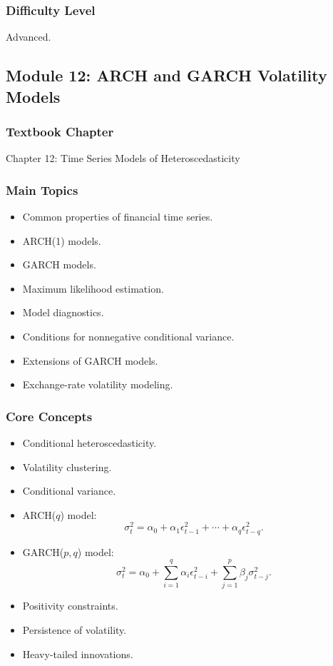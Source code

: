 \documentclass[11pt]{article}
\begin{document}
\subsubsection*{Difficulty Level}
Advanced.

\subsection{Module 12: ARCH and GARCH Volatility Models}

\subsubsection*{Textbook Chapter}
Chapter 12: Time Series Models of Heteroscedasticity

\subsubsection*{Main Topics}
\begin{itemize}
    \item Common properties of financial time series.
    \item ARCH(1) models.
    \item GARCH models.
    \item Maximum likelihood estimation.
    \item Model diagnostics.
    \item Conditions for nonnegative conditional variance.
    \item Extensions of GARCH models.
    \item Exchange-rate volatility modeling.
\end{itemize}

\subsubsection*{Core Concepts}
\begin{itemize}
    \item Conditional heteroscedasticity.
    \item Volatility clustering.
    \item Conditional variance.
    \item ARCH($q$) model:
    \[
        \sigma_t^2 = \alpha_0 +
        \alpha_1\epsilon_{t-1}^2 + \cdots +
        \alpha_q\epsilon_{t-q}^2.
    \]
    \item GARCH($p,q$) model:
    \[
        \sigma_t^2 = \alpha_0 +
        \sum_{i=1}^{q}\alpha_i\epsilon_{t-i}^2 +
        \sum_{j=1}^{p}\beta_j\sigma_{t-j}^2.
    \]
    \item Positivity constraints.
    \item Persistence of volatility.
    \item Heavy-tailed innovations.
\end{itemize}
\end{document}
